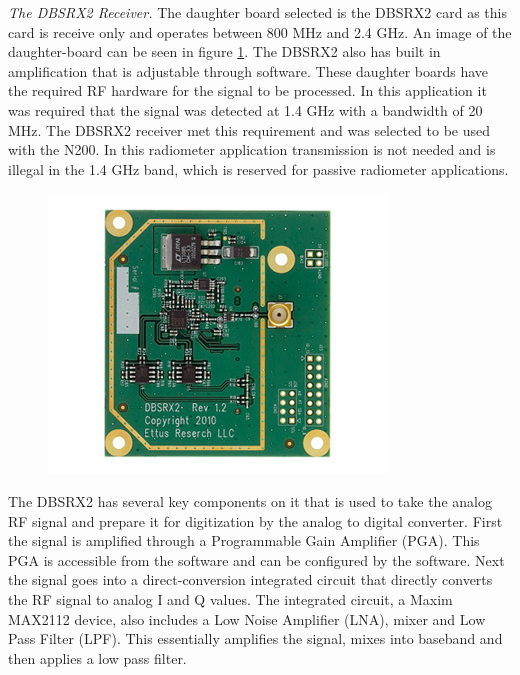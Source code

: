 

\emph{The DBSRX2 Receiver.}  The daughter board selected is the DBSRX2 card as this card is receive only and operates between 800 MHz and 2.4 GHz.  An image of the daughter-board can be seen in figure \ref{dbsrx2}.  The DBSRX2 also has built in amplification that is adjustable through software.  These daughter boards have the required RF hardware for the signal to be processed.  In this application it was required that the signal was detected at 1.4 GHz with a bandwidth of 20 MHz.  The DBSRX2 receiver met this requirement and was selected to be used with the N200.  In this radiometer application transmission is not needed and is illegal in the 1.4 GHz band, which is reserved for passive radiometer applications.

{\begin{figure}[h!tb] 
\centering
\includegraphics{Images/dbsrx2.jpg}
\label{dbsrx2}
\end{figure}
}

The DBSRX2 has several key components on it that is used to take the analog RF signal and prepare it for digitization by the analog to digital converter.  First the signal is amplified through a Programmable Gain Amplifier (PGA).  This PGA is accessible from the software and can be configured by the software.  Next the signal goes into a direct-conversion integrated circuit that directly converts the RF signal to analog I and Q values.  The integrated circuit, a Maxim MAX2112 device, also includes a Low Noise Amplifier (LNA), mixer and Low Pass Filter (LPF).  This essentially amplifies the signal, mixes into baseband and then applies a low pass filter.  

